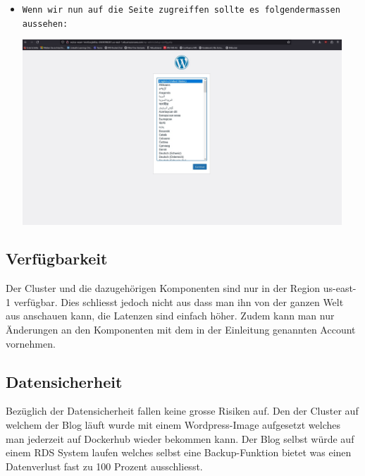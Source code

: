 \documentclass{article}
\begin{document}
\begin{itemize}
\item \texttt{Wenn wir nun auf die Seite zugreiffen sollte es folgendermassen aussehen: 
} \\

\begin{center}
    \includegraphics[width=12cm]{images/wordpress_10.jpg}
\end{center}

\end{itemize}

\subsection{Verfügbarkeit}
Der Cluster und die dazugehörigen Komponenten sind nur in der Region us-east-1 verfügbar. Dies schliesst jedoch nicht aus dass man ihn von der ganzen Welt aus anschauen kann, die Latenzen sind einfach höher. Zudem kann man nur Änderungen an den Komponenten mit dem in der Einleitung genannten Account vornehmen.

\subsection{Datensicherheit}
Bezüglich der Datensicherheit fallen keine grosse Risiken auf. Den der Cluster auf welchem der Blog läuft wurde mit einem Wordpress-Image aufgesetzt welches man jederzeit auf Dockerhub wieder bekommen kann. Der Blog selbst würde auf einem RDS System laufen welches selbst eine Backup-Funktion bietet was einen Datenverlust fast zu 100 Prozent ausschliesst.
\end{document}
